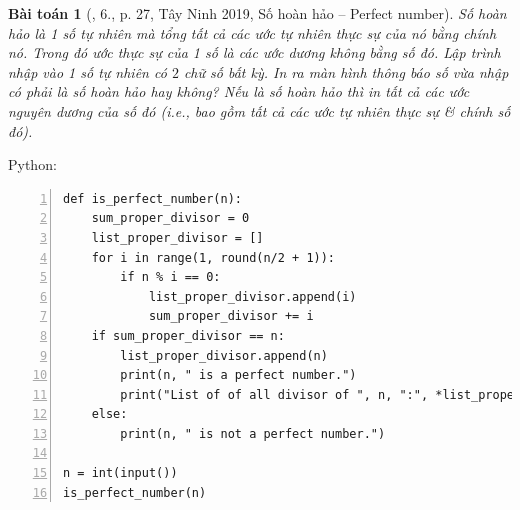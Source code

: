\documentclass{article}
\newtheorem{baitoan}{Bài toán}
\begin{document}
\begin{baitoan}[\cite{VietSTEM2021}, 6., p. 27, Tây Ninh 2019, Số hoàn hảo -- Perfect number]
	\emph{Số hoàn hảo} là 1 số tự nhiên mà tổng tất cả các ước tự nhiên thực sự của nó bằng chính nó. Trong đó ước thực sự của 1 số là các ước dương không bằng số đó. Lập trình nhập vào 1 số tự nhiên có $2$ chữ số bất kỳ. In ra màn hình thông báo số vừa nhập có phải là số hoàn hảo hay không? Nếu là số hoàn hảo thì in tất cả các ước nguyên dương của số đó (i.e., bao gồm tất cả các ước tự nhiên thực sự \& chính số đó).
\end{baitoan}
Python:
\begin{Verbatim}[numbers=left,xleftmargin=5mm]
def is_perfect_number(n):
    sum_proper_divisor = 0
    list_proper_divisor = []
    for i in range(1, round(n/2 + 1)):
        if n % i == 0:
            list_proper_divisor.append(i)
            sum_proper_divisor += i
    if sum_proper_divisor == n:
        list_proper_divisor.append(n)
        print(n, " is a perfect number.")
        print("List of of all divisor of ", n, ":", *list_proper_divisor)
    else:
        print(n, " is not a perfect number.")

n = int(input())
is_perfect_number(n)
\end{Verbatim}
\end{document}
